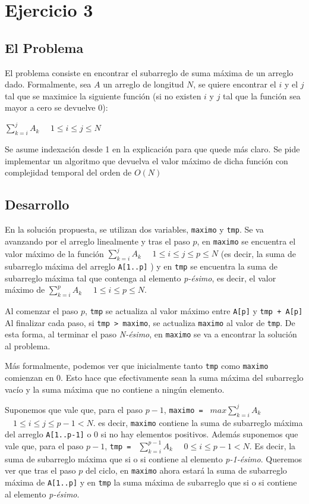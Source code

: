 \section{Ejercicio 3}
\subsection{El Problema}
El problema consiste en encontrar el subarreglo de suma máxima de un arreglo dado. Formalmente, sea $A$ un arreglo de longitud $N$, se quiere encontrar el $i$ y el $j$ tal que se maximice la siguiente función (si no existen $i$ y $j$ tal que la función sea mayor a cero se devuelve 0): 
\begin{center} $\sum_{k=i}^{j} A_k$            $ \quad 1\leq i\leq j\leq N$
\end{center}
Se asume indexación desde 1 en la explicación para que quede más claro.
Se pide implementar un algoritmo que devuelva el valor máximo de dicha función con complejidad temporal del orden de $O(N)$
\subsection{Desarrollo}
En la solución propuesta, se utilizan dos variables, \texttt{maximo} y \texttt{tmp}. Se va avanzando por el arreglo linealmente y tras el paso $p$, en  \texttt{maximo} se encuentra el valor máximo de la función $\sum_{k=i}^{j} A_k$            $ \quad 1\leq i\leq j\leq p \leq N$ (es decir, la suma de subarreglo máxima del arreglo  \texttt{A[1..p]} ) y en  \texttt{tmp} se encuentra la suma de subarreglo máxima tal que contenga al elemento \emph{p-ésimo}, es decir, el valor máximo de  $\sum_{k=i}^{p} A_k$            $ \quad 1\leq i\leq p\leq N$.


Al comenzar el paso $p$,  \texttt{tmp} se actualiza al valor máximo entre  \texttt{A[p]} y  \texttt{tmp + A[p]}
Al finalizar cada paso, si  \texttt{tmp > maximo}, se actualiza  \texttt{maximo} al valor de  \texttt{tmp}.
De esta forma, al terminar el paso \emph{N-ésimo}, en \texttt{maximo} se va a encontrar la solución al problema.

Más formalmente, podemos ver que inicialmente tanto \texttt{tmp} como \texttt{maximo} comienzan en 0. Esto hace que efectivamente sean la suma máxima del subarreglo vacío y la suma máxima que no contiene a ningún elemento.

Suponemos que vale que, para el paso $p-1$, \texttt{maximo = } $ max \sum_{k=i}^{j} A_k$            $ \quad 1\leq i\leq j\leq p-1 < N$. es decir, \texttt{maximo} contiene la suma de subarreglo máxima del arreglo \texttt{A[1..p-1]} o 0 si no hay elementos positivos. Además suponemos que vale que, para el paso $p-1$, \texttt{tmp = } $\sum_{k=i}^{p-1} A_k$            $ \quad 0\leq i\leq p-1 < N$. Es decir, la suma de subarreglo máxima que si o si contiene al elemento \emph{p-1-ésimo}. Queremos ver que tras el paso $p$ del ciclo, en \texttt{maximo} ahora estará la suma de subarreglo máxima de \texttt{A[1..p]} y en \texttt{tmp} la suma máxima de subarreglo que si o si contiene al elemento \emph{p-ésimo}.

